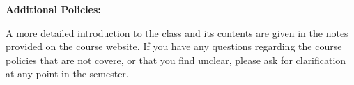 \documentclass[12pt, a4paper]{article}
\begin{document}
\bigskip

\textbf{Additional Policies:} \vspace{6pt}


A more detailed introduction to the class and its contents are given in the notes provided
on the course website. If you have any questions regarding the course policies that are not
covere, or that you find unclear, please ask for clarification at any point in the semester.
\end{document}
